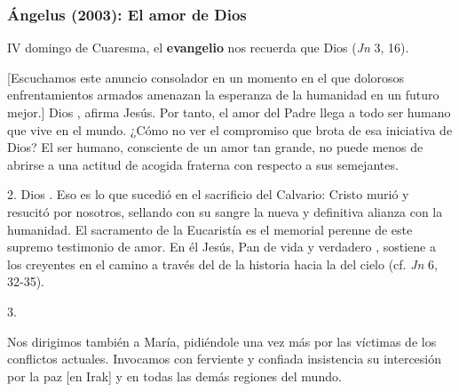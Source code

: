 \newpage

\subsubsection{Ángelus (2003): El amor de Dios}


\begin{body}
 IV domingo de Cuaresma, el \textbf{evangelio} nos recuerda que Dios  (\textit{Jn} 3, 16).

[Escuchamos este anuncio consolador en un momento en el que dolorosos enfrentamientos armados amenazan la esperanza de la humanidad en un futuro mejor.] Dios , afirma Jesús. Por tanto, el amor del Padre llega a todo ser humano que vive en el mundo. ¿Cómo no ver el compromiso que brota de esa iniciativa de Dios? El ser humano, consciente de un amor tan grande, no puede menos de abrirse a una actitud de acogida fraterna con respecto a sus semejantes.

2. Dios . Eso es lo que sucedió en el sacrificio del Calvario: Cristo murió y resucitó por nosotros, sellando con su sangre la nueva y definitiva alianza con la humanidad. El sacramento de la Eucaristía es el memorial perenne de este supremo testimonio de amor. En él Jesús, Pan de vida y verdadero , sostiene a los creyentes en el camino a través del  de la historia hacia la  del cielo (cf. \textit{Jn} 6, 32-35).

3. 

Nos dirigimos también a María, pidiéndole una vez más por las víctimas de los conflictos actuales. Invocamos con ferviente y confiada insistencia su intercesión por la paz [en Irak] y en todas las demás regiones del mundo.
\end{body}



